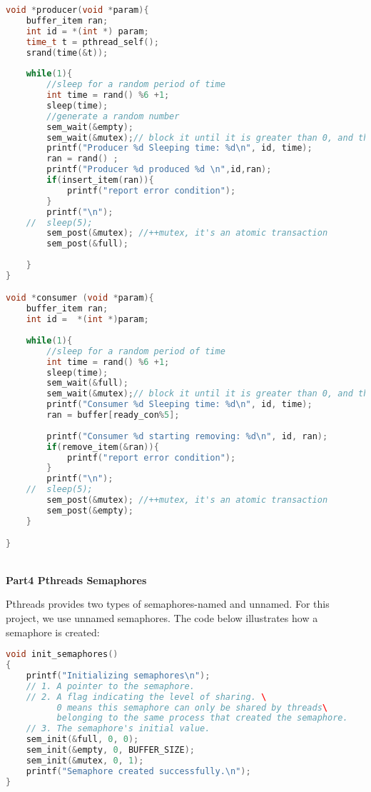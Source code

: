 \documentclass[12pt,a4paper]{article}
\begin{document}
\begin{lstlisting}[language=C++]
void *producer(void *param){
	buffer_item ran;
	int id = *(int *) param;
	time_t t = pthread_self();
	srand(time(&t));
	
	while(1){
		//sleep for a random period of time 
		int time = rand() %6 +1;
		sleep(time);
		//generate a random number
		sem_wait(&empty);
		sem_wait(&mutex);// block it until it is greater than 0, and then --mutex 
		printf("Producer %d Sleeping time: %d\n", id, time);
		ran = rand() ;
		printf("Producer %d produced %d \n",id,ran);
		if(insert_item(ran)){
			printf("report error condition");
		}
		printf("\n");
	//	sleep(5);
		sem_post(&mutex); //++mutex, it's an atomic transaction
		sem_post(&full);
	
	}
}

void *consumer (void *param){
	buffer_item ran;
	int id =  *(int *)param;
	
	while(1){
		//sleep for a random period of time 
		int time = rand() %6 +1;
		sleep(time);
		sem_wait(&full);
		sem_wait(&mutex);// block it until it is greater than 0, and then --mutex  
		printf("Consumer %d Sleeping time: %d\n", id, time);
		ran = buffer[ready_con%5];
		
		printf("Consumer %d starting removing: %d\n", id, ran);
		if(remove_item(&ran)){
			printf("report error condition");
		}
		printf("\n");
	//	sleep(5);
		sem_post(&mutex); //++mutex, it's an atomic transaction
		sem_post(&empty);
	}

}

\end{lstlisting}

~\\
\textbf{Part4 Pthreads Semaphores }

Pthreads provides two types of semaphores-named and unnamed. For this project, we use unnamed semaphores. 
 The code below illustrates how a semaphore is created:

\begin{lstlisting}[language=C++]
void init_semaphores()
{
	printf("Initializing semaphores\n");
	// 1. A pointer to the semaphore.
	// 2. A flag indicating the level of sharing. \
	      0 means this semaphore can only be shared by threads\
	      belonging to the same process that created the semaphore.
	// 3. The semaphore's initial value.
	sem_init(&full, 0, 0);
	sem_init(&empty, 0, BUFFER_SIZE);
	sem_init(&mutex, 0, 1);
	printf("Semaphore created successfully.\n");
}

\end{lstlisting}
\end{document}
